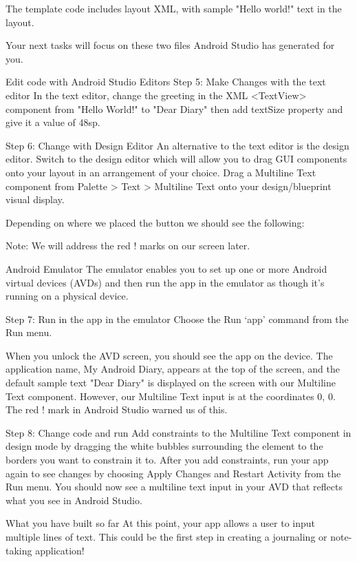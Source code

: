         The template code includes layout XML, with sample "Hello world!" text in the layout.

        Your next tasks will focus on these two files Android Studio has generated for you.

Edit code with Android Studio Editors
    Step 5: Make Changes with the text editor
        In the text editor, change the greeting in the XML <TextView> component from "Hello World!" to "Dear Diary" then add textSize property and give it a value of 48sp.

    Step 6: Change with Design Editor
        An alternative to the text editor is the design editor. Switch to the design editor which will allow you to drag GUI components onto your layout in an arrangement of your choice. Drag a Multiline Text component from Palette > Text > Multiline Text onto your design/blueprint visual display.

        Depending on where we placed the button we should see the following:

        Note: We will address the red ! marks on our screen later.

Android Emulator
        The emulator enables you to set up one or more Android virtual devices (AVDs) and then run the app in the emulator as though it’s running on a physical device.

    Step 7: Run in the app in the emulator
        Choose the Run ‘app’ command from the Run menu.

        When you unlock the AVD screen, you should see the app on the device. The application name, My Android Diary, appears at the top of the screen, and the default sample text "Dear Diary" is displayed on the screen with our Multiline Text component. However, our Multiline Text input is at the coordinates 0, 0. The red ! mark in Android Studio warned us of this.

    Step 8: Change code and run
        Add constraints to the Multiline Text component in design mode by dragging the white bubbles surrounding the element to the borders you want to constrain it to. After you add constraints, run your app again to see changes by choosing Apply Changes and Restart Activity from the Run menu. You should now see a multiline text input in your AVD that reflects what you see in Android Studio.

What you have built so far
        At this point, your app allows a user to input multiple lines of text. This could be the first step in creating a journaling or note-taking application!


